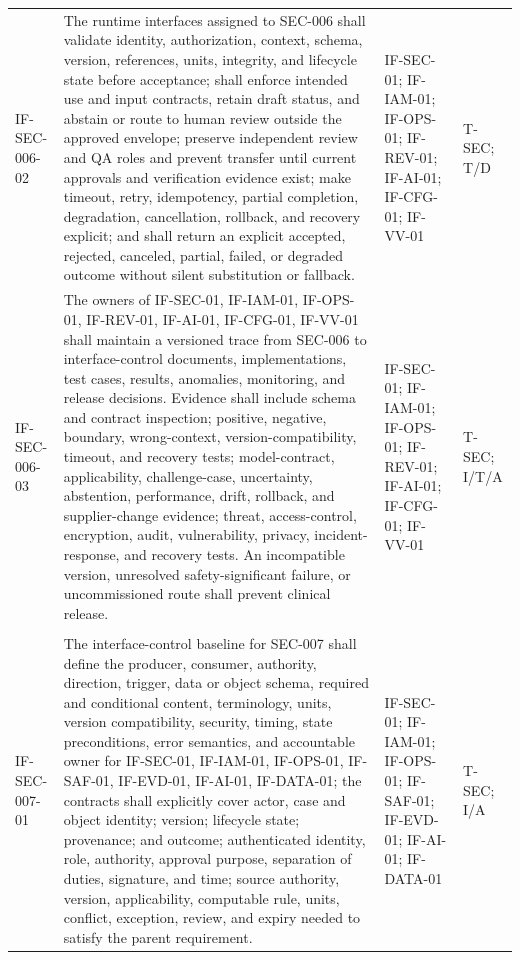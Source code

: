 \documentclass[11pt,letterpaper]{article}
\begin{document}
\begin{scriptsize}
\begin{longtable}{@{}L{0.14\textwidth}L{0.49\textwidth}L{0.19\textwidth}L{0.10\textwidth}@{}}
\addlinespace[2pt]
\mbox{IF-SEC-006-02} & The runtime interfaces assigned to SEC-006 shall validate identity, authorization, context, schema, version, references, units, integrity, and lifecycle state before acceptance; shall enforce intended use and input contracts, retain draft status, and abstain or route to human review outside the approved envelope; preserve independent review and QA roles and prevent transfer until current approvals and verification evidence exist; make timeout, retry, idempotency, partial completion, degradation, cancellation, rollback, and recovery explicit; and shall return an explicit accepted, rejected, canceled, partial, failed, or degraded outcome without silent substitution or fallback. & IF-SEC-01; IF-IAM-01; IF-OPS-01; IF-REV-01; IF-AI-01; IF-CFG-01; IF-VV-01 & T-SEC; T\slash\allowbreak{}D \\
\addlinespace[2pt]
\mbox{IF-SEC-006-03} & The owners of IF-SEC-01, IF-IAM-01, IF-OPS-01, IF-REV-01, IF-AI-01, IF-CFG-01, IF-VV-01 shall maintain a versioned trace from SEC-006 to interface-control documents, implementations, test cases, results, anomalies, monitoring, and release decisions. Evidence shall include schema and contract inspection; positive, negative, boundary, wrong-context, version-compatibility, timeout, and recovery tests; model-contract, applicability, challenge-case, uncertainty, abstention, performance, drift, rollback, and supplier-change evidence; threat, access-control, encryption, audit, vulnerability, privacy, incident-response, and recovery tests. An incompatible version, unresolved safety-significant failure, or uncommissioned route shall prevent clinical release. & IF-SEC-01; IF-IAM-01; IF-OPS-01; IF-REV-01; IF-AI-01; IF-CFG-01; IF-VV-01 & T-SEC; I\slash\allowbreak{}T\slash\allowbreak{}A \\
\addlinespace[2pt]
 \\
\addlinespace[2pt]
\mbox{IF-SEC-007-01} & The interface-control baseline for SEC-007 shall define the producer, consumer, authority, direction, trigger, data or object schema, required and conditional content, terminology, units, version compatibility, security, timing, state preconditions, error semantics, and accountable owner for IF-SEC-01, IF-IAM-01, IF-OPS-01, IF-SAF-01, IF-EVD-01, IF-AI-01, IF-DATA-01; the contracts shall explicitly cover actor, case and object identity; version; lifecycle state; provenance; and outcome; authenticated identity, role, authority, approval purpose, separation of duties, signature, and time; source authority, version, applicability, computable rule, units, conflict, exception, review, and expiry needed to satisfy the parent requirement. & IF-SEC-01; IF-IAM-01; IF-OPS-01; IF-SAF-01; IF-EVD-01; IF-AI-01; IF-DATA-01 & T-SEC; I\slash\allowbreak{}A \\

\end{longtable}
\end{scriptsize}
\end{document}
